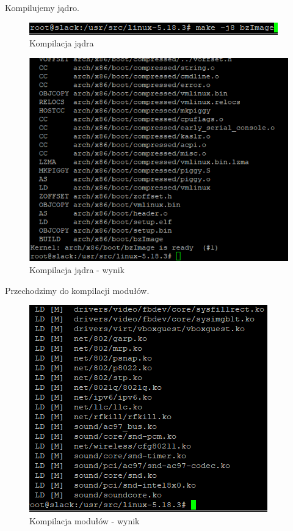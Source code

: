 \documentclass[a4paper,12pt,oneside]{book} %
\begin{document}
Kompilujemy jądro.

\begin{figure}[h]
	\centering
	\includegraphics[scale=0.6]{31-comp}
	\caption{Kompilacja jądra}
\end{figure}

\begin{figure}[h]
	\centering
	\includegraphics[scale=0.6]{32-comp}
	\caption{Kompilacja jądra - wynik}
\end{figure}

\pagebreak

Przechodzimy do kompilacji modułów.

\begin{figure}[h]
	\centering
	\includegraphics[scale=0.6]{33-comp}
	\caption{Kompilacja modułów - wynik}
\end{figure}
\end{document}
